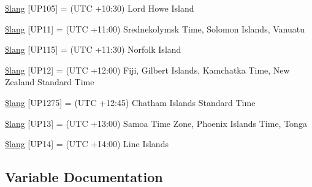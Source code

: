 \begin{DoxyCompactItemize}
\item 
\hyperlink{system_2language_2english_2date__lang_8php_aeb674ae9d76fd6d0d9c9e77ed5a212e9}{\$lang} \mbox{[}\textquotesingle{}U\+P105\textquotesingle{}\mbox{]} = \textquotesingle{}(U\+T\+C +10\+:30) Lord Howe Island\textquotesingle{}
\item 
\hyperlink{system_2language_2english_2date__lang_8php_a463ad4d63523352c17685f734b4ec7cc}{\$lang} \mbox{[}\textquotesingle{}U\+P11\textquotesingle{}\mbox{]} = \textquotesingle{}(U\+T\+C +11\+:00) Srednekolymsk Time, Solomon Islands, Vanuatu\textquotesingle{}
\item 
\hyperlink{system_2language_2english_2date__lang_8php_a46fa8957c8e606d1641bbcdd75cd2df0}{\$lang} \mbox{[}\textquotesingle{}U\+P115\textquotesingle{}\mbox{]} = \textquotesingle{}(U\+T\+C +11\+:30) Norfolk Island\textquotesingle{}
\item 
\hyperlink{system_2language_2english_2date__lang_8php_a18a8bb072c3fe7db99091538ce5168be}{\$lang} \mbox{[}\textquotesingle{}U\+P12\textquotesingle{}\mbox{]} = \textquotesingle{}(U\+T\+C +12\+:00) Fiji, Gilbert Islands, Kamchatka Time, New Zealand Standard Time\textquotesingle{}
\item 
\hyperlink{system_2language_2english_2date__lang_8php_a92e3c23bd9d963bbdfd21e39521bfdc1}{\$lang} \mbox{[}\textquotesingle{}U\+P1275\textquotesingle{}\mbox{]} = \textquotesingle{}(U\+T\+C +12\+:45) Chatham Islands Standard Time\textquotesingle{}
\item 
\hyperlink{system_2language_2english_2date__lang_8php_ac197fec09ff547ca12a7fe3ffc5908ae}{\$lang} \mbox{[}\textquotesingle{}U\+P13\textquotesingle{}\mbox{]} = \textquotesingle{}(U\+T\+C +13\+:00) Samoa Time Zone, Phoenix Islands Time, Tonga\textquotesingle{}
\item 
\hyperlink{system_2language_2english_2date__lang_8php_a50562230c497ebdba1f540d409110fce}{\$lang} \mbox{[}\textquotesingle{}U\+P14\textquotesingle{}\mbox{]} = \textquotesingle{}(U\+T\+C +14\+:00) Line Islands\textquotesingle{}
\end{DoxyCompactItemize}


\subsection{Variable Documentation}
\hypertarget{system_2language_2english_2date__lang_8php_ad344b819f5b881c0e2d75c994b8781b7}{}
